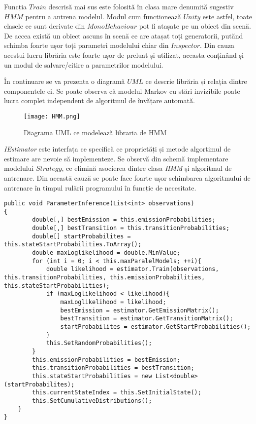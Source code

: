 Funcția $Train$ descrisă mai sus este folosită în clasa mare denumită sugestiv $HMM$ pentru a antrena modelul. Modul cum funcționează $Unity$ este astfel, toate clasele ce sunt derivate din $MonoBehaviour$ pot fi atașate pe un obiect din scenă. De accea există un obiect ascuns în scenă ce are atașat toți generatorii, putănd schimba foarte ușor toți parametri modelului chiar din $Inspector$. Din cauza acestui lucru librăria este foarte ușor de preluat și utilizat, aceasta conținând și un modul de salvare/citire a parametrilor modelului.\par

În continuare se va prezenta o diagramă $UML$ ce descrie librăria și relația dintre componentele ei. Se poate observa că modelul Markov cu stări invizibile poate lucra complet independent de algoritmul de învățare automată.\par

\vspace{10mm}
\begin{figure}[H]
\centering
\texttt{[image: HMM.png]} \par
\caption{Diagrama UML ce modelează libraria de HMM}
\end{figure}

\textit{IEstimator} este interfața ce specifică ce proprietăți și metode algortimul de estimare are nevoie să implementeze. Se observă din schemă implementare modelului $Strategy$, ce elimină asocierea dintre clasa \textit{HMM} și algoritmul de antrenare. Din această cauză se poate face foarte ușor schimbarea algoritmului de antrenare în timpul rulării programului în funcție de necesitate.\par

\begin{lstlisting}[caption=Folosirea funcție $Train$ în cadrul modelului]
public void ParameterInference(List<int> observations)
{
        double[,] bestEmission = this.emissionProbabilities;
        double[,] bestTransition = this.transitionProbabilities;
        double[] startProbabilites = this.stateStartProbabilities.ToArray();
        double maxLoglikelihood = double.MinValue;
        for (int i = 0; i < this.maxParalelModels; ++i){
            double likelihood = estimator.Train(observations, this.transitionProbabilities, this.emissionProbabilities, this.stateStartProbabilities);
            if (maxLoglikelihood < likelihood){
                maxLoglikelihood = likelihood;
                bestEmission = estimator.GetEmissionMatrix();
                bestTransition = estimator.GetTransitionMatrix();
                startProbabilites = estimator.GetStartProbabilities();
            }
            this.SetRandomProbabilities();
        }
        this.emissionProbabilities = bestEmission;
        this.transitionProbabilities = bestTransition;
        this.stateStartProbabilities = new List<double>(startProbabilites);
        this.currentStateIndex = this.SetInitialState();
        this.SetCumulativeDistributions();
    }
}
\end{lstlisting}


